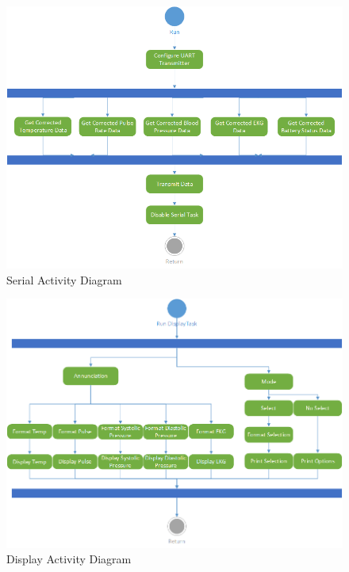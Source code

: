 \documentclass[12pt]{article} %
\begin{document}
    \begin{figure}[H]
      \centering
      \includegraphics[width=\textwidth]{../design/serial_activity.png}
      \caption{Serial Activity Diagram}
      \label{fig:serialActivity}
    \end{figure}

    \begin{figure}[H]
      \centering
      \includegraphics[width=\textwidth]{../design/display_activity.png}
      \caption{Display Activity Diagram}
      \label{fig:displayActivity}
    \end{figure}
\end{document}
